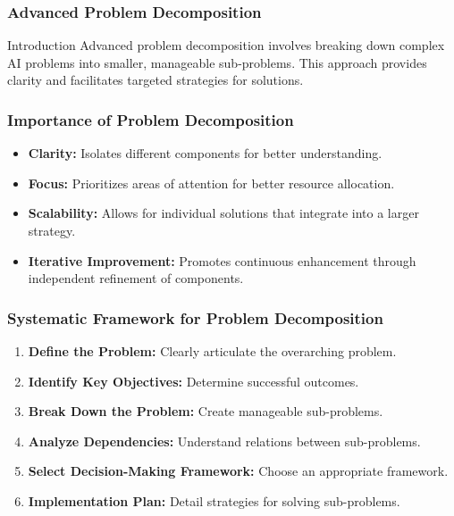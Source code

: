 \documentclass[aspectratio=169]{beamer}
\begin{document}
\begin{frame}[fragile]
    \frametitle{Advanced Problem Decomposition}
    \begin{block}{Introduction}
        Advanced problem decomposition involves breaking down complex AI problems into smaller, manageable sub-problems. This approach provides clarity and facilitates targeted strategies for solutions.
    \end{block}
\end{frame}

\begin{frame}[fragile]
    \frametitle{Importance of Problem Decomposition}
    \begin{itemize}
        \item \textbf{Clarity:} Isolates different components for better understanding.
        \item \textbf{Focus:} Prioritizes areas of attention for better resource allocation.
        \item \textbf{Scalability:} Allows for individual solutions that integrate into a larger strategy.
        \item \textbf{Iterative Improvement:} Promotes continuous enhancement through independent refinement of components.
    \end{itemize}
\end{frame}

\begin{frame}[fragile]
    \frametitle{Systematic Framework for Problem Decomposition}
    \begin{enumerate}
        \item \textbf{Define the Problem:} Clearly articulate the overarching problem.
        \item \textbf{Identify Key Objectives:} Determine successful outcomes.
        \item \textbf{Break Down the Problem:} Create manageable sub-problems.
        \item \textbf{Analyze Dependencies:} Understand relations between sub-problems.
        \item \textbf{Select Decision-Making Framework:} Choose an appropriate framework.
        \item \textbf{Implementation Plan:} Detail strategies for solving sub-problems.
    \end{enumerate}
\end{frame}
\end{document}
